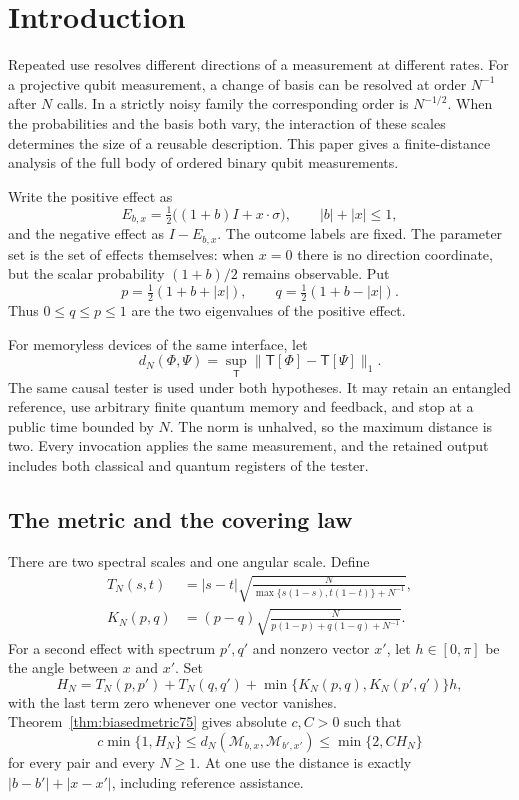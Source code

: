 \section{Introduction}
Repeated use resolves different directions of a measurement at different
rates. For a projective qubit measurement, a change of basis can be
resolved at order $N^{-1}$ after $N$ calls. In a strictly noisy family
the corresponding order is $N^{-1/2}$. When the probabilities and the
basis both vary, the interaction of these scales determines the size
of a reusable description. This paper gives a finite-distance analysis
of the full body of ordered binary qubit measurements.

Write the positive effect as
\[
 E_{b,x}=\tfrac12\bigl((1+b)I+x\cdot\sigma\bigr),
 \qquad |b|+|x|\le1,
\]
and the negative effect as $I-E_{b,x}$. The outcome labels are fixed.
The parameter set is the set of effects themselves: when $x=0$ there
is no direction coordinate, but the scalar probability $(1+b)/2$
remains observable. Put
\[
 p=\tfrac12(1+b+|x|),\qquad q=\tfrac12(1+b-|x|).
\]
Thus $0\le q\le p\le1$ are the two eigenvalues of the positive effect.

For memoryless devices of the same interface, let
\[
 d_N(\Phi,\Psi)=\sup_{\mathsf T}
       \|\mathsf T[\Phi]-\mathsf T[\Psi]\|_1.
\]
The same causal tester is used under both hypotheses. It may retain
an entangled reference, use arbitrary finite quantum memory and
feedback, and stop at a public time bounded by $N$. The norm is
unhalved, so the maximum distance is two. Every invocation applies
the same measurement, and the retained output includes both classical
and quantum registers of the tester.

\subsection{The metric and the covering law}
There are two spectral scales and one angular scale. Define
\begin{align*}
 T_N(s,t)&=|s-t|\sqrt{\frac{N}
   {\max\{s(1-s),t(1-t)\}+N^{-1}}},\\
 K_N(p,q)&=(p-q)\sqrt{\frac{N}
   {p(1-p)+q(1-q)+N^{-1}}}.
\end{align*}
For a second effect with spectrum $p',q'$ and nonzero vector $x'$,
let $h\in[0,\pi]$ be the angle between $x$ and $x'$. Set
\[
 H_N=T_N(p,p')+T_N(q,q')
       +\min\{K_N(p,q),K_N(p',q')\}h,
\]
with the last term zero whenever one vector vanishes.
Theorem~\ref{thm:biasedmetric75} gives absolute $c,C>0$ such that
\[
 c\min\{1,H_N\}\le d_N(\mathcal M_{b,x},\mathcal M_{b',x'})
                  \le\min\{2,CH_N\}
\]
for every pair and every $N\ge1$. At one use the distance is exactly
$|b-b'|+|x-x'|$, including reference assistance.

